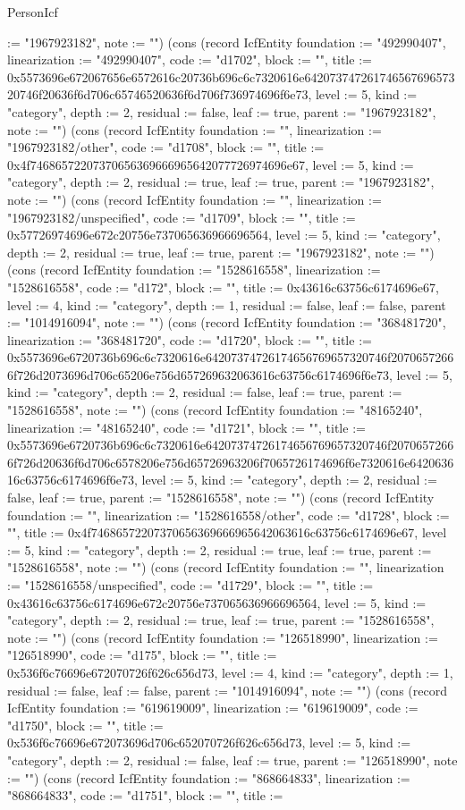 \begin{lexlean}{PersonIcf}
\begin{semanticmodule}
{:= "1967923182", note := ""}) (cons (record IcfEntity {foundation := "492990407", linearization := "492990407", code := "d1702", block := "", title := 0x5573696e672067656e6572616c20736b696c6c7320616e64207374726174656769657320746f20636f6d706c65746520636f6d706f736974696f6e73, level := 5, kind := "category", depth := 2, residual := false, leaf := true, parent := "1967923182", note := ""}) (cons (record IcfEntity {foundation := "", linearization := "1967923182/other", code := "d1708", block := "", title := 0x4f74686572207370656369666965642077726974696e67, level := 5, kind := "category", depth := 2, residual := true, leaf := true, parent := "1967923182", note := ""}) (cons (record IcfEntity {foundation := "", linearization := "1967923182/unspecified", code := "d1709", block := "", title := 0x57726974696e672c20756e737065636966696564, level := 5, kind := "category", depth := 2, residual := true, leaf := true, parent := "1967923182", note := ""}) (cons (record IcfEntity {foundation := "1528616558", linearization := "1528616558", code := "d172", block := "", title := 0x43616c63756c6174696e67, level := 4, kind := "category", depth := 1, residual := false, leaf := false, parent := "1014916094", note := ""}) (cons (record IcfEntity {foundation := "368481720", linearization := "368481720", code := "d1720", block := "", title := 0x5573696e6720736b696c6c7320616e64207374726174656769657320746f20706572666f726d2073696d706c65206e756d657269632063616c63756c6174696f6e73, level := 5, kind := "category", depth := 2, residual := false, leaf := true, parent := "1528616558", note := ""}) (cons (record IcfEntity {foundation := "48165240", linearization := "48165240", code := "d1721", block := "", title := 0x5573696e6720736b696c6c7320616e64207374726174656769657320746f20706572666f726d20636f6d706c6578206e756d65726963206f7065726174696f6e7320616e642063616c63756c6174696f6e73, level := 5, kind := "category", depth := 2, residual := false, leaf := true, parent := "1528616558", note := ""}) (cons (record IcfEntity {foundation := "", linearization := "1528616558/other", code := "d1728", block := "", title := 0x4f74686572207370656369666965642063616c63756c6174696e67, level := 5, kind := "category", depth := 2, residual := true, leaf := true, parent := "1528616558", note := ""}) (cons (record IcfEntity {foundation := "", linearization := "1528616558/unspecified", code := "d1729", block := "", title := 0x43616c63756c6174696e672c20756e737065636966696564, level := 5, kind := "category", depth := 2, residual := true, leaf := true, parent := "1528616558", note := ""}) (cons (record IcfEntity {foundation := "126518990", linearization := "126518990", code := "d175", block := "", title := 0x536f6c76696e672070726f626c656d73, level := 4, kind := "category", depth := 1, residual := false, leaf := false, parent := "1014916094", note := ""}) (cons (record IcfEntity {foundation := "619619009", linearization := "619619009", code := "d1750", block := "", title := 0x536f6c76696e672073696d706c652070726f626c656d73, level := 5, kind := "category", depth := 2, residual := false, leaf := true, parent := "126518990", note := ""}) (cons (record IcfEntity {foundation := "868664833", linearization := "868664833", code := "d1751", block := "", title := }
\end{semanticmodule}
\end{lexlean}
